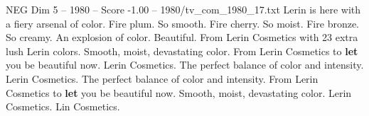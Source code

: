 \begin{textsample}{NEG Dim 5 – 1980 – Score -1.00 – 1980/tv\_com\_1980\_17.txt}  \label{ex:f5_neg_085}
Lerin is here with a fiery arsenal of color.
Fire plum.
So smooth.
Fire cherry.
So moist.
Fire bronze.
So creamy.
An explosion of color.
Beautiful.
From Lerin Cosmetics with 23 extra lush Lerin colors.
Smooth, moist, devastating color.
From Lerin Cosmetics to \textbf{let} you be beautiful now.
Lerin Cosmetics.
The perfect balance of color and intensity.
Lerin Cosmetics.
The perfect balance of color and intensity.
From Lerin Cosmetics to \textbf{let} you be beautiful now.
Smooth, moist, devastating color.
Lerin Cosmetics.
Lin Cosmetics.

\end{textsample}
